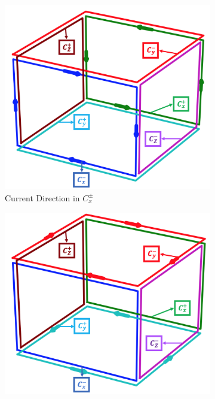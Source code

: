 \begin{figure}
    \begin{subfigure}{.5\linewidth}
        \centering
        \includegraphics[scale=.28]{Images/c1_3}
        \caption{Current Direction in $C_x^{\pm}$}
        \label{fig:c1}
    \end{subfigure}%
    \begin{subfigure}{.5\linewidth}
        \centering
        \includegraphics[scale=.28]{Images/c3_3}

\end{subfigure}
\end{figure}
